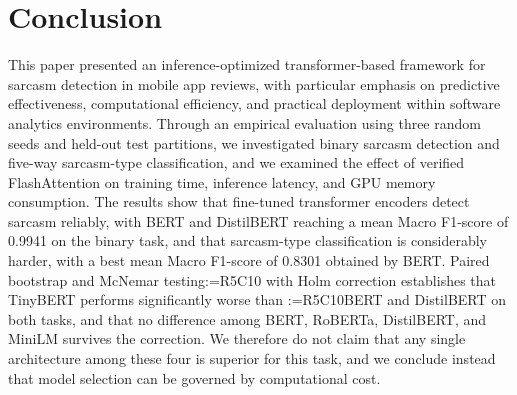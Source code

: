 \documentclass[a4paper,fleqn]{cas-sc}
\makeatletter
\newif\iftracked
\newcommand{\rv@setcolour}[1]{%
  \IfStrEq{#1}{R7C7}{\color{rvEdit}}{%
    \IfSubStr{#1}{R5}{\IfSubStr{#1}{R7}{\color{rvBoth}}{\color{rvFive}}}{\color{rvSeven}}}}
\newcommand{\rv@tag}[1]{\textsuperscript{\sffamily\bfseries\scriptsize[\StrSubstitute{#1}{,}{, }]}\,}
\newcommand{\rv@recordone}[1]{%
  \edef\rv@i{#1}%
  \ifcsdef{rv@n@\rv@i}{}{\csgdef{rv@n@\rv@i}{0}}%
  \csxdef{rv@n@\rv@i}{\the\numexpr\csuse{rv@n@\rv@i}+1\relax}%
  \begingroup\edef\@currentlabel{\rv@i}\label{rv:\rv@i:\csuse{rv@n@\rv@i}}\endgroup}
\newcommand{\rv@record}[1]{\@for\rv@id:=#1\do{\expandafter\rv@recordone\expandafter{\rv@id}}}
\DeclareRobustCommand{\rc}[2]{\rv@record{#1}\iftracked{\rv@setcolour{#1}\rv@tag{#1}#2}\else#2\fi}
\DeclareRobustCommand{\rcrep}[3]{\rv@record{#1}\iftracked{\rv@setcolour{#1}\rv@tag{#1}\rv@strike{#2} #3}\else#3\fi}
\makeatother
\begin{document}
\section{Conclusion}
\label{sec:conclusion}
This paper presented an inference-optimized transformer-based framework for sarcasm detection in mobile app reviews, with particular emphasis on predictive effectiveness, computational efficiency, and practical deployment within software analytics environments. Through an empirical evaluation using three random seeds and held-out test partitions, we investigated binary sarcasm detection and five-way sarcasm-type classification, and we examined the effect of verified FlashAttention on training time, inference latency, and GPU memory consumption. The results show that fine-tuned transformer encoders detect sarcasm reliably, with BERT and DistilBERT reaching a mean Macro F1-score of 0.9941 on the binary task, and that sarcasm-type classification is considerably harder, with a best mean Macro F1-score of 0.8301 obtained by BERT. Paired bootstrap and McNemar testing\rc{R5C10}{ with Holm correction} establishes that TinyBERT performs significantly worse than \rcrep{R5C10}{the other four architectures on both tasks, and that the differences among BERT, RoBERTa, DistilBERT, and MiniLM are not reliably distinguishable across seeds}{BERT and DistilBERT on both tasks, and that no difference among BERT, RoBERTa, DistilBERT, and MiniLM survives the correction}. We therefore do not claim that any single architecture among these four is superior for this task, and we conclude instead that model selection can be governed by computational cost.
\end{document}
